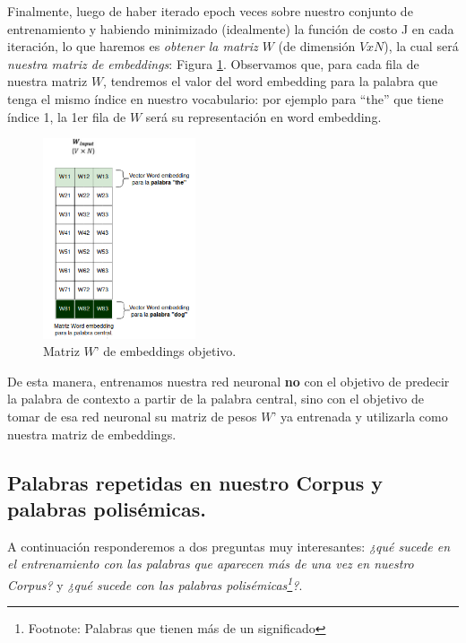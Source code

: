 \documentclass[12pt,a4paper]{article}
\begin{document}
\begin{sloppypar}
\begin{enumerate}
\end{enumerate}
      
Finalmente, luego de haber iterado epoch veces sobre nuestro conjunto de entrenamiento y habiendo minimizado (idealmente) la función de costo J en cada iteración, lo que haremos es \textit{obtener la matriz $W$} (de dimensión $V x N$), la cual será \textit{nuestra matriz de embeddings}: Figura \ref{fig:9_EjSkip}. Observamos que, para cada fila de nuestra matriz $W$, tendremos el valor del word embedding para la palabra que tenga el mismo índice en nuestro vocabulario: por ejemplo para “the” que tiene índice 1, la 1er fila de $W$ será su representación en word embedding.

\begin{figure}[H]    %
\centering
\includegraphics[width=0.4\textwidth]{images/Ejemplo_Skipgram/9_EjSkip.png}
\caption{Matriz $W’$ de embeddings objetivo.} 
\label{fig:9_EjSkip}
\end{figure}

De esta manera, entrenamos nuestra red neuronal \textbf{no} con el objetivo de predecir la palabra de contexto a partir de la palabra central, sino con el objetivo de tomar de esa red neuronal su matriz de pesos $W’$ ya entrenada y utilizarla como nuestra matriz de embeddings.

\cleardoublepage

\subsection{Palabras repetidas en nuestro Corpus y palabras polisémicas.}\label{anexo_polisem}

A continuación responderemos a dos preguntas muy interesantes: \textit{¿qué sucede en el entrenamiento con las palabras que aparecen más de una vez en nuestro Corpus?} y \textit{¿qué sucede con las palabras polisémicas\footnote{Footnote: Palabras que tienen más de un significado}?}.


\end{sloppypar}
\end{document}
